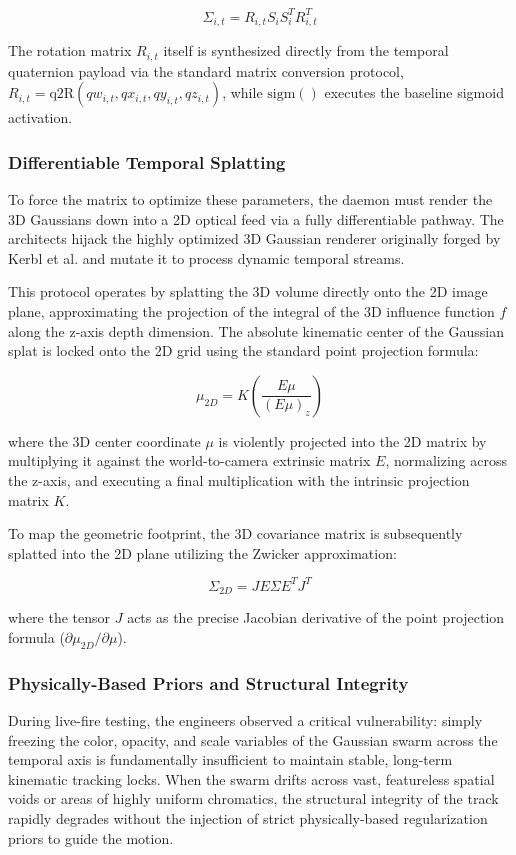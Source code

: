 \begin{equation}
\Sigma_{i,t} = R_{i,t} S_i S_i^T R_{i,t}^T
\end{equation}

The rotation matrix $R_{i,t}$ itself is synthesized directly from the temporal quaternion payload via the standard matrix conversion protocol, $R_{i,t} = \text{q2R}(qw_{i,t}, qx_{i,t}, qy_{i,t}, qz_{i,t})$, while $\text{sigm}()$ executes the baseline sigmoid activation.

\subsubsection{Differentiable Temporal Splatting}
To force the matrix to optimize these parameters, the daemon must render the 3D Gaussians down into a 2D optical feed via a fully differentiable pathway. \cite{luiten2023dynamic3d} The architects hijack the highly optimized 3D Gaussian renderer originally forged by Kerbl et al. and mutate it to process dynamic temporal streams. 

This protocol operates by splatting the 3D volume directly onto the 2D image plane, approximating the projection of the integral of the 3D influence function $f$ along the z-axis depth dimension. The absolute kinematic center of the Gaussian splat is locked onto the 2D grid using the standard point projection formula:

\begin{equation}
\mu_{2D} = K \left( \frac{E\mu}{(E\mu)_z} \right)
\end{equation}

where the 3D center coordinate $\mu$ is violently projected into the 2D matrix by multiplying it against the world-to-camera extrinsic matrix $E$, normalizing across the z-axis, and executing a final multiplication with the intrinsic projection matrix $K$. 

To map the geometric footprint, the 3D covariance matrix is subsequently splatted into the 2D plane utilizing the Zwicker approximation:

\begin{equation}
\Sigma_{2D} = J E \Sigma E^T J^T
\end{equation}

where the tensor $J$ acts as the precise Jacobian derivative of the point projection formula ($\partial\mu_{2D} / \partial\mu$).

\subsubsection{Physically-Based Priors and Structural Integrity}
During live-fire testing, the engineers observed a critical vulnerability: simply freezing the color, opacity, and scale variables of the Gaussian swarm across the temporal axis is fundamentally insufficient to maintain stable, long-term kinematic tracking locks. When the swarm drifts across vast, featureless spatial voids or areas of highly uniform chromatics, the structural integrity of the track rapidly degrades without the injection of strict physically-based regularization priors to guide the motion.

